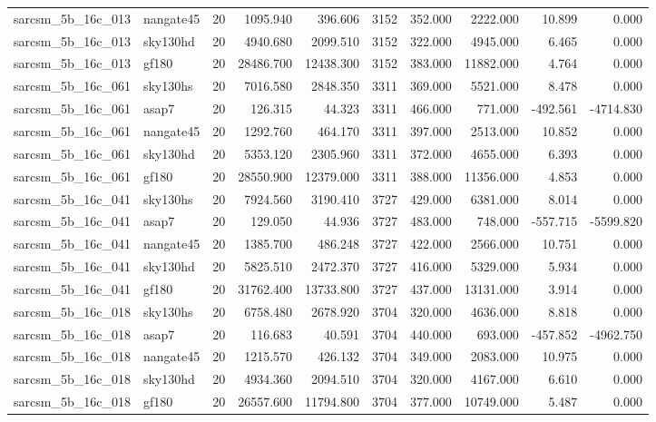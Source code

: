\documentclass{article}
\begin{document}
\begin{longtable}{llrrrrrrrr}
sarcsm\_5b\_16c\_013 & nangate45 & 20 & 1095.940 & 396.606 & 3152 & 352.000 & 2222.000 & 10.899 & 0.000 \\
sarcsm\_5b\_16c\_013 & sky130hd & 20 & 4940.680 & 2099.510 & 3152 & 322.000 & 4945.000 & 6.465 & 0.000 \\
sarcsm\_5b\_16c\_013 & gf180 & 20 & 28486.700 & 12438.300 & 3152 & 383.000 & 11882.000 & 4.764 & 0.000 \\
sarcsm\_5b\_16c\_061 & sky130hs & 20 & 7016.580 & 2848.350 & 3311 & 369.000 & 5521.000 & 8.478 & 0.000 \\
sarcsm\_5b\_16c\_061 & asap7 & 20 & 126.315 & 44.323 & 3311 & 466.000 & 771.000 & -492.561 & -4714.830 \\
sarcsm\_5b\_16c\_061 & nangate45 & 20 & 1292.760 & 464.170 & 3311 & 397.000 & 2513.000 & 10.852 & 0.000 \\
sarcsm\_5b\_16c\_061 & sky130hd & 20 & 5353.120 & 2305.960 & 3311 & 372.000 & 4655.000 & 6.393 & 0.000 \\
sarcsm\_5b\_16c\_061 & gf180 & 20 & 28550.900 & 12379.000 & 3311 & 388.000 & 11356.000 & 4.853 & 0.000 \\
sarcsm\_5b\_16c\_041 & sky130hs & 20 & 7924.560 & 3190.410 & 3727 & 429.000 & 6381.000 & 8.014 & 0.000 \\
sarcsm\_5b\_16c\_041 & asap7 & 20 & 129.050 & 44.936 & 3727 & 483.000 & 748.000 & -557.715 & -5599.820 \\
sarcsm\_5b\_16c\_041 & nangate45 & 20 & 1385.700 & 486.248 & 3727 & 422.000 & 2566.000 & 10.751 & 0.000 \\
sarcsm\_5b\_16c\_041 & sky130hd & 20 & 5825.510 & 2472.370 & 3727 & 416.000 & 5329.000 & 5.934 & 0.000 \\
sarcsm\_5b\_16c\_041 & gf180 & 20 & 31762.400 & 13733.800 & 3727 & 437.000 & 13131.000 & 3.914 & 0.000 \\
sarcsm\_5b\_16c\_018 & sky130hs & 20 & 6758.480 & 2678.920 & 3704 & 320.000 & 4636.000 & 8.818 & 0.000 \\
sarcsm\_5b\_16c\_018 & asap7 & 20 & 116.683 & 40.591 & 3704 & 440.000 & 693.000 & -457.852 & -4962.750 \\
sarcsm\_5b\_16c\_018 & nangate45 & 20 & 1215.570 & 426.132 & 3704 & 349.000 & 2083.000 & 10.975 & 0.000 \\
sarcsm\_5b\_16c\_018 & sky130hd & 20 & 4934.360 & 2094.510 & 3704 & 320.000 & 4167.000 & 6.610 & 0.000 \\
sarcsm\_5b\_16c\_018 & gf180 & 20 & 26557.600 & 11794.800 & 3704 & 377.000 & 10749.000 & 5.487 & 0.000 \\

\end{longtable}
\end{document}
